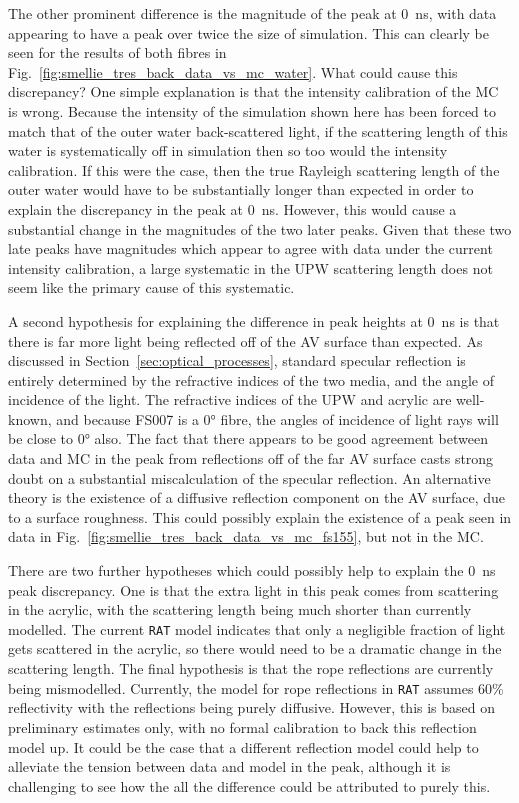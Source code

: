The other prominent difference is the magnitude of the peak at \SI{0}{\ns}, with data appearing to have a peak over twice the size of simulation. This can clearly be seen for the results of both fibres in Fig.~\ref{fig:smellie_tres_back_data_vs_mc_water}. What could cause this discrepancy? One simple explanation is that the intensity calibration of the MC is wrong. Because the intensity of the simulation shown here has been forced to match that of the outer water back-scattered light, if the scattering length of this water is systematically off in simulation then so too would the intensity calibration. If this were the case, then the true Rayleigh scattering length of the outer water would have to be substantially longer than expected in order to explain the discrepancy in the peak at \SI{0}{\ns}. However, this would cause a substantial change in the magnitudes of the two later peaks. Given that these two late peaks have magnitudes which appear to agree with data under the current intensity calibration, a large systematic in the UPW scattering length does not seem like the primary cause of this systematic.

A second hypothesis for explaining the difference in peak heights at \SI{0}{\ns} is that there is far more light being reflected off of the AV surface than expected. As discussed in Section~\ref{sec:optical_processes}, standard specular reflection is entirely determined by the refractive indices of the two media, and the angle of incidence of the light. The refractive indices of the UPW and acrylic are well-known, and because FS007 is a \ang{0} fibre, the angles of incidence of light rays will be close to \ang{0} also. The fact that there appears to be good agreement between data and MC in the peak from reflections off of the far AV surface casts strong doubt on a substantial miscalculation of the specular reflection. An alternative theory is the existence of a diffusive reflection component on the AV surface, due to a surface roughness. This could possibly explain the existence of a peak seen in data in Fig.~\ref{fig:smellie_tres_back_data_vs_mc_fs155}, but not in the MC.

There are two further hypotheses which could possibly help to explain the \SI{0}{\ns} peak discrepancy. One is that the extra light in this peak comes from scattering in the acrylic, with the scattering length being much shorter than currently modelled. The current \texttt{RAT} model indicates that only a negligible fraction of light gets scattered in the acrylic, so there would need to be a dramatic change in the scattering length. The final hypothesis is that the rope reflections are currently being mismodelled. Currently, the model for rope reflections in \texttt{RAT} assumes 60\% reflectivity with the reflections being purely diffusive. However, this is based on preliminary estimates only, with no formal calibration to back this reflection model up. It could be the case that a different reflection model could help to alleviate the tension between data and model in the peak, although it is challenging to see how the all the difference could be attributed to purely this.


